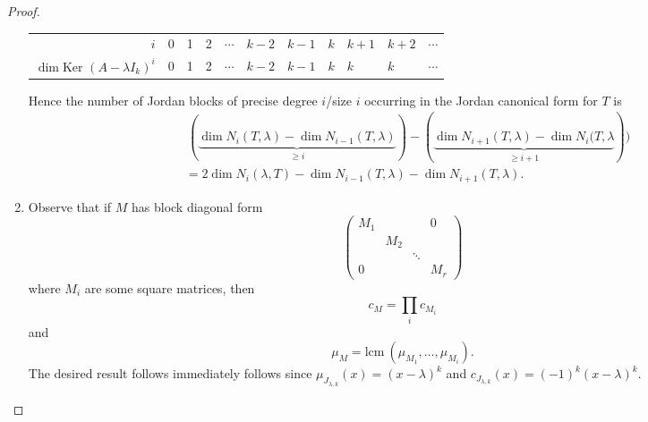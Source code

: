 \documentclass[a4paper]{article}
\newcommand{\Ker}{\text{Ker }}
\newcommand{\lcm}{\text{lcm}\ }
\theoremstyle{definition}
\begin{document}
\begin{proof}
\begin{enumerate}
    \begin{table}[h]
    \begin{tabular}{r|llllllllll}
        $i$ & 0 & 1 & 2 & $\cdots$ & $k-2$ & $k-1$ & $k$ & $k+1$ & $k+2$ & $\cdots$ \\
        $\dim \Ker (A-\lambda I_k)^i$  & 0 & 1 & 2 & $\cdots$ & $k-2$ & $k-1$ & $k$ & $k$   & $k$   & $\cdots$
    \end{tabular}
    \end{table}
    
    Hence the number of Jordan blocks of precise degree $i$/size $i$ occurring in the Jordan canonical form for $T$ is
\[
\begin{aligned}
        &\, (\underbrace{\dim N_i(T,\lambda)-\dim N_{i-1}(T,\lambda)}_{\geq i})-(\underbrace{\dim N_{i+1}(T,\lambda)-\dim N_{i}(T,\lambda}_{\geq i+1}))\\&=2\dim N_i(\lambda,T)-\dim N_{i-1}(T,\lambda)-\dim N_{i+1}(T,\lambda).
    \end{aligned}
\]
    
    \item Observe that if $M$ has block diagonal form
\[
\begin{pmatrix}M_1 & & & 0\\ & M_2 & & \\ & & \ddots & \\ 0 & & & M_r\end{pmatrix}
\]
where $M_i$ are some square matrices, then
\[
c_{M}=\prod_i c_{M_i}
\]
and
\[
\mu_{M}=\lcm (\mu_{M_1},\ldots,\mu_{M_i}) .
\]
The desired result follows immediately follows since $\mu_{J_{\lambda,k}}(x)=(x-\lambda)^k$ and $c_{J_{\lambda,k}}(x)=(-1)^k(x-\lambda)^k$.
\end{enumerate}
\end{proof}
\end{document}
